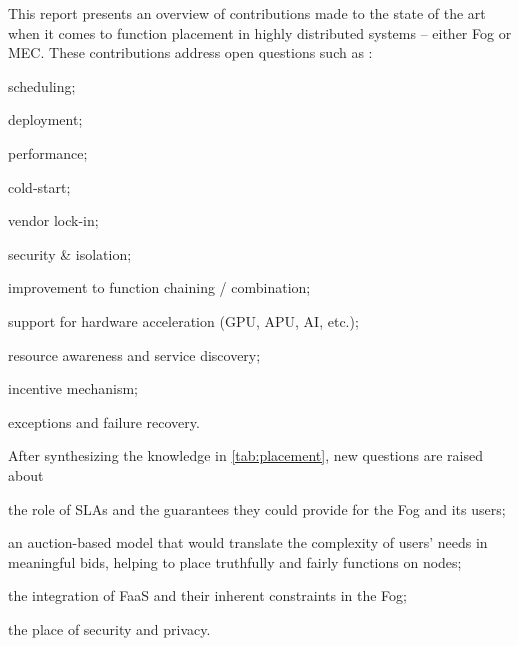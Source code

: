 \documentclass[11pt]{sdm}
\begin{document}
This report presents an overview of contributions made to the state of the art when it comes to function placement in highly distributed systems -- either Fog or \gls{MEC}. These contributions address open questions such as \cite{kjorveziroski_iot_2021,xie_when_2021}:
\begin{enumerate*}[(a)]
	\item scheduling;
	\item deployment;
	\item performance;
	\item cold-start;
	\item vendor lock-in;
	\item security \& isolation;
	\item improvement to function chaining / combination;
	\item support for hardware acceleration (\gls{GPU}, \gls{APU}, \gls{AI}, etc.);
	\item resource awareness and service discovery;
	\item incentive mechanism;
	\item exceptions and failure recovery.
\end{enumerate*}
After synthesizing the knowledge in \cref{tab:placement}, new questions are raised about
\begin{enumerate*}[(i)]
	\item the role of \glspl{SLA} and the guarantees they could provide for the Fog and its users;
	\item an auction-based model that would translate the complexity of users' needs in meaningful bids, helping to place truthfully and fairly functions on nodes;
	\item the integration of \gls{FaaS} and their inherent constraints in the Fog;
	\item the place of security and privacy.
\end{enumerate*}

\printbibliography
\end{document}
